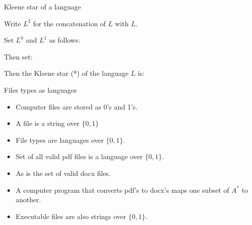 \documentclass{beamer}
\begin{document}
\begin{frame}{Kleene star of a language}


  \vspace{2mm}

  Write $L^2$ for the concatenation of $L$ with $L$.


  \vspace{2mm}

  Set $L^0$ and $L^1$ as follows:


  \vspace{2mm}

  Then set:


  \vspace{2mm}

  Then the Kleene star (*) of the language $L$ is:


\end{frame}


\begin{frame}{Files types as languages}
  \begin{itemize}
    \setlength\itemsep{3mm}
    \item Computer files are stored as 0's and 1's.
    \item A file is a string over $\{ 0, 1 \}$
    \item File types are languages over $\{ 0, 1 \}$.
    \item Set of all valid pdf files is a language over $\{ 0,1 \}$.
    \item As is the set of valid docx files.
    \item A computer program that converts pdf's to docx's maps one subset of $A^*$ to another.
    \item Executable files are also strings over $\{ 0, 1 \}$.
  \end{itemize}
\end{frame}
\end{document}
